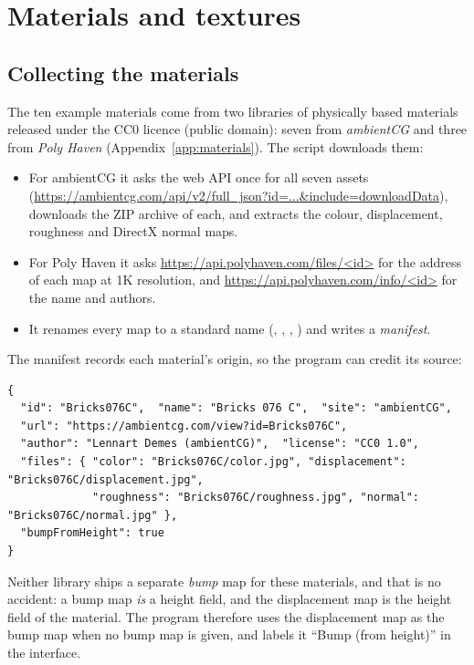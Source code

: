 \chapter{Materials and textures}
\label{ch:materials}

\section{Collecting the materials}
The ten example materials come from two libraries of physically based materials released under
the CC0 licence (public domain): seven from \emph{ambientCG} and three from \emph{Poly Haven}
(Appendix~\ref{app:materials}). The script  downloads them:
\begin{itemize}
\item For ambientCG it asks the web API once for all seven assets
(\url{https://ambientcg.com/api/v2/full_json?id=...&include=downloadData}), downloads the
 ZIP archive of each, and extracts the colour, displacement, roughness and DirectX
normal maps.
\item For Poly Haven it asks \url{https://api.polyhaven.com/files/<id>} for the address of each map
at 1K resolution, and \url{https://api.polyhaven.com/info/<id>} for the name and authors.
\item It renames every map to a standard name (, ,
, ) and writes a \emph{manifest}.
\end{itemize}
The manifest records each material's origin, so the program can credit its source:
\begin{lstlisting}[language={},numbers=none,basicstyle=\ttfamily\footnotesize]
{
  "id": "Bricks076C",  "name": "Bricks 076 C",  "site": "ambientCG",
  "url": "https://ambientcg.com/view?id=Bricks076C",
  "author": "Lennart Demes (ambientCG)",  "license": "CC0 1.0",
  "files": { "color": "Bricks076C/color.jpg", "displacement": "Bricks076C/displacement.jpg",
             "roughness": "Bricks076C/roughness.jpg", "normal": "Bricks076C/normal.jpg" },
  "bumpFromHeight": true
}
\end{lstlisting}
Neither library ships a separate \emph{bump} map for these materials, and that is no accident:
a bump map \emph{is} a height field, and the displacement map is the height field of the material.
The program therefore uses the displacement map as the bump map when no bump map is given, and
labels it ``Bump (from height)'' in the interface.

